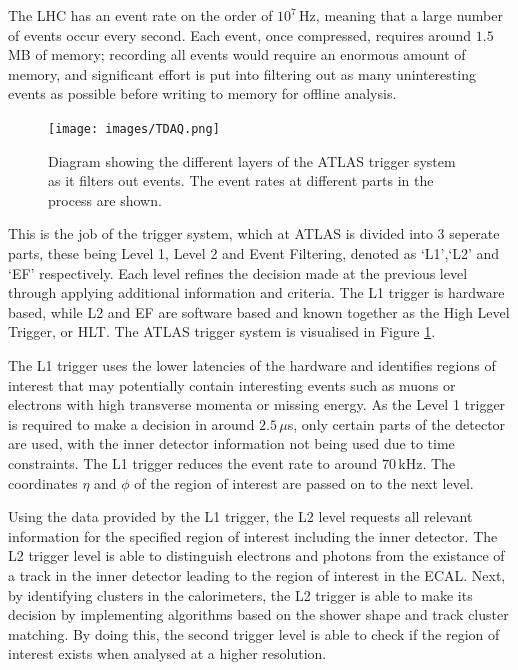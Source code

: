 \documentclass{article}
\begin{document}
The LHC has an event rate on the order of $10^7\,$Hz, meaning that a large number of events occur every second. Each event, once compressed, requires around $1.5\,$MB of memory; recording all events would require an enormous amount of memory, and significant effort is put into filtering out as many uninteresting events as possible before writing to memory for offline analysis.

\begin{figure}[h]
    \centering
    \texttt{[image: images/TDAQ.png]}
    \caption{ Diagram showing the different layers of the ATLAS trigger system as it filters out events. The event rates at different parts in the process are shown.\label{fig:TDAQ} }
\end{figure}

This is the job of the trigger system, which at ATLAS is divided into 3 seperate parts, these being Level 1, Level 2 and Event Filtering, denoted as `L1',`L2' and `EF' respectively.  Each level refines the decision made at the previous level through applying additional information and criteria. The L1 trigger is hardware based, while L2 and EF are software based and known together as the High Level Trigger, or HLT. The ATLAS trigger system is visualised in Figure \ref{fig:TDAQ}.

The L1 trigger uses the lower latencies of the hardware and identifies regions of interest that may potentially contain interesting events such as muons or electrons with high transverse momenta or missing energy. As the Level 1 trigger is required to make a decision in around $2.5\,\mu$s, only certain parts of the detector are used, with the inner detector information not being used due to time constraints. The L1 trigger reduces the event rate to around $70\,$kHz. The coordinates $\eta$ and $\phi$ of the region of interest are passed on to the next level.

Using the data provided by the L1 trigger, the L2 level requests all relevant information for the specified region of interest including the inner detector. The L2 trigger level is able to distinguish electrons and photons from the existance of a track in the inner detector leading to the region of interest in the ECAL. Next, by identifying clusters in the calorimeters, the L2 trigger is able to make its decision by implementing algorithms based on the shower shape and track cluster matching. By doing this, the second trigger level is able to check if the region of interest exists when analysed at a higher resolution.
\end{document}
